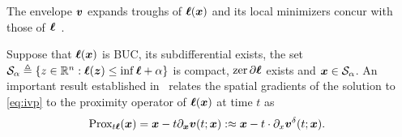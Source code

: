 The envelope $\bm{v}$ expands troughs of $\bm{\ell}(\bm{x})$ and its local minimizers concur with those of $\bm{\ell}$~\citet{Chaudhari2018}. 
%
\begin{lemma}
	Suppose that $\bm{\ell}(\bm{x})$ is BUC, its subdifferential exists, the set $\mathcal{S}_\alpha \triangleq \{z \in \mathbb{R}^n: \bm{\ell}(\bm{z}) \le \inf \bm{\ell} + \alpha \}$ is compact, $\text{zer}\, \partial \bm{\ell}$ exists and $\bm{x} \in \mathcal{S}_\alpha$. An important result established in~\citet[Lemma A.3]{HJMAD} relates the spatial gradients of the solution to \eqref{eq:ivp} to the proximity operator of $\bm{\ell}(\bm{x})$ at time $t$ as  
		\begin{align}
		\text{ Prox}_{t\bm{\ell}}(\bm{x}) &= \bm{x} - t \partial_{\bm{x}}  \bm{v}(t; \bm{x}) :\approx \bm{x} -  t \cdot \partial_x\bm{v}^\delta(t; \bm{x}).
		\label{eq:prox-hj}
		\end{align}
\end{lemma}
%
